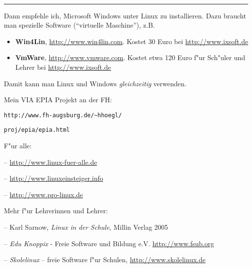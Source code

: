 \documentclass[11pt]{article}
\begin{document}
\begin{minipage}[t]{7cm}
\hfill {\Large{}}\\
\hrule

\medskip


Dann empfehle ich, Microsoft Windows unter Linux zu installieren. Dazu
braucht man spezielle Software ("`virtuelle Maschine"'), z.B.

\begin{itemize}

\item {\bf Win4Lin}, \url{http://www.win4lin.com}. Kostet 30 Euro bei 
   \url{http://www.ixsoft.de}

\item {\bf VmWare}, \url{http://www.vmware.com}. Kostet etwa 120 Euro f"ur
  Sch"uler und Lehrer bei \url{http://www.ixsoft.de} 

\end{itemize}

Damit kann man Linux und Windows {\em gleichzeitig} verwenden.

\medskip


\medskip

Mein VIA EPIA Projekt an der FH:

\centerline{{\tt http://www.fh-augsburg.de/\~{}hhoegl/}}
\centerline{{\tt proj/epia/epia.html}}

\bigskip

F"ur alle:

\smallskip

-- \url{http://www.linux-fuer-alle.de}

-- \url{http://www.linuxeinsteiger.info} 

-- \url{http://www.pro-linux.de} 


\bigskip

Mehr f"ur Lehrerinnen und Lehrer:

\medskip

-- Karl Sarnow, {\em Linux in der Schule}, Millin Verlag 2005

-- {\em Edu Knoppix} - Freie Software und Bildung e.V.
\url{http://www.fsub.org}

-- {\em Skolelinux} -- freie Software f"ur Schulen, 
   \url{http://www.skolelinux.de}




\end{minipage}
\end{document}

